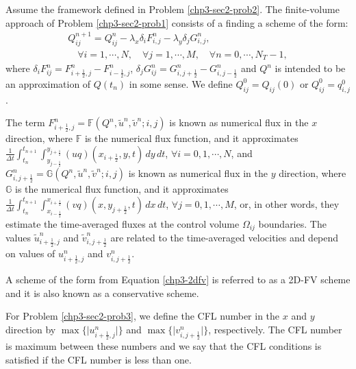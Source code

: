 \begin{prob}[2D-FV scheme]
	\label{chp3-sec2-prob3}
	Assume the framework defined in Problem \ref{chp3-sec2-prob2}.
	The finite-volume approach of Problem \ref{chp3-sec2-prob1}
	consists of a finding a scheme of the form:
	\begin{align}
		\label{chp3-2dfv}
		{Q}_{ij}^{n+1} =  {Q}_{ij}^{n} - {\lambda_x} \delta_i {F}_{i,j}^{n} - {\lambda_y } \delta_j {G}_{i,j}^{n},
		\\ \nonumber \quad \forall i = 1, \cdots, N, \quad \forall j = 1, \cdots, M,
		\quad \forall n = 0, \cdots, N_T-1,
	\end{align}
	where $ \delta_i F_{ij}^n =
    {F}_{i+\frac{1}{2},j}^{n} 
    - {F}_{i-\frac{1}{2},j}^{n}$,
    $ \delta_j G_{ij}^n =
    {G}_{i,j+\frac{1}{2}}^{n} 
    - {G}_{i,j-\frac{1}{2}}^{n}$ 
    and ${Q}^{n}$ is intended to be an approximation
	of ${Q}(t_{n})$ in some sense. We define ${Q}_{ij}^{0} = {Q}_{ij}(0)$ or
	${Q}_{ij}^{0} = {q}^0_{i,j}$.
    
    The term ${F}_{i+\frac{1}{2}, j}^{n} = {\mathbb{F}}
    (Q^n, \tilde{u}^n, \tilde{v}^n; i,j)
    $ is known as numerical flux in the 
    $x$ direction, where $\mathbb{F}$ is the numerical flux function, 
    and it approximates
	$\frac{1}{\Delta t}\int_{t_n}^{t_{n+1}} 
    \int_{y_{j-\frac{1}{2}}}^{y_{j+\frac{1}{2}}} 
    (uq)(x_{i+\frac{1}{2}}, y, t) \,dy \,dt $,
    $\forall i = 0, 1, \cdots, N$, and 
	${G}_{i, j+\frac{1}{2}}^{n} = 
    {\mathbb{G}} (Q^n, \tilde{u}^n, \tilde{v}^n; i, j)$ 
    is known as numerical flux in the 
    $y$ direction, where $\mathbb{G}$ 
    is the numerical flux function, and it approximates
	$\frac{1}{\Delta t}\int_{t_n}^{t_{n+1}}  
    \int_{x_{i-\frac{1}{2}}}^{x_{i+\frac{1}{2}}}
    (vq)(x, y_{j+\frac{1}{2}}, t) \,dx \,dt $,
    $\forall j = 0, 1, \cdots, M$,
	or, in other words, they estimate the time-averaged
    fluxes at the control volume $\Omega_{ij}$ boundaries.
  	The values $\tilde{u}_{i+\frac{1}{2},j}^n$ and $\tilde{v}_{i,j+\frac{1}{2}}^n$ are related to the time-averaged velocities
  	and depend on values of $u_{i+\frac{1}{2},j}^n$ and $v_{i,j+\frac{1}{2}}^n$.
\end{prob}
\begin{remark}
	A scheme of the form from Equation \eqref{chp3-2dfv} is referred to as a 2D-FV scheme and
	it is also known as a conservative scheme.
\end{remark}
\begin{remark}
For Problem \ref{chp3-sec2-prob3}, we define the CFL number in the $x$ and $y$ direction
by $\max \{{|u_{i+\frac{1}{2},j}^n}|\}$ and $\max \{ {|v_{i,j+\frac{1}{2}}^n}|\}$, respectively.
The CFL number is maximum between these numbers and we say that the CFL conditions is
satisfied if the CFL number is less than one. 
\end{remark}
